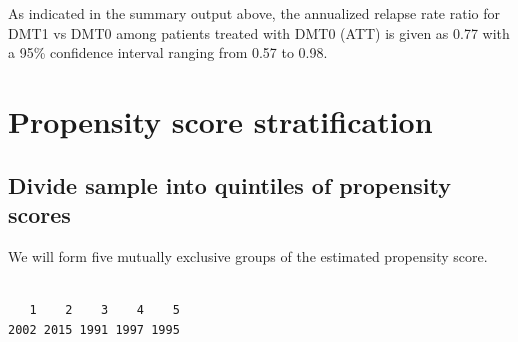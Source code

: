 \documentclass[
  letterpaper,
  DIV=11,
  numbers=noendperiod]{scrreprt}
\newenvironment{Shaded}{\begin{snugshade}}{\end{snugshade}}
\newcommand{\AttributeTok}[1]{\textcolor[rgb]{0.40,0.45,0.13}{#1}}
\newcommand{\CommentTok}[1]{\textcolor[rgb]{0.37,0.37,0.37}{#1}}
\newcommand{\ConstantTok}[1]{\textcolor[rgb]{0.56,0.35,0.01}{#1}}
\newcommand{\DecValTok}[1]{\textcolor[rgb]{0.68,0.00,0.00}{#1}}
\newcommand{\FloatTok}[1]{\textcolor[rgb]{0.68,0.00,0.00}{#1}}
\newcommand{\FunctionTok}[1]{\textcolor[rgb]{0.28,0.35,0.67}{#1}}
\newcommand{\NormalTok}[1]{\textcolor[rgb]{0.00,0.23,0.31}{#1}}
\newcommand{\OtherTok}[1]{\textcolor[rgb]{0.00,0.23,0.31}{#1}}
\newcommand{\SpecialCharTok}[1]{\textcolor[rgb]{0.37,0.37,0.37}{#1}}
\begin{document}
As indicated in the summary output above, the annualized relapse rate
ratio for DMT1 vs DMT0 among patients treated with DMT0 (ATT) is given
as 0.77 with a 95\% confidence interval ranging from 0.57 to 0.98.

\hypertarget{propensity-score-stratification}{%
\section{Propensity score
stratification}\label{propensity-score-stratification}}

\hypertarget{divide-sample-into-quintiles-of-propensity-scores}{%
\subsection{Divide sample into quintiles of propensity
scores}\label{divide-sample-into-quintiles-of-propensity-scores}}

We will form five mutually exclusive groups of the estimated propensity
score.

\begin{Shaded}
\end{Shaded}

\begin{verbatim}

   1    2    3    4    5 
2002 2015 1991 1997 1995 
\end{verbatim}
\end{document}

